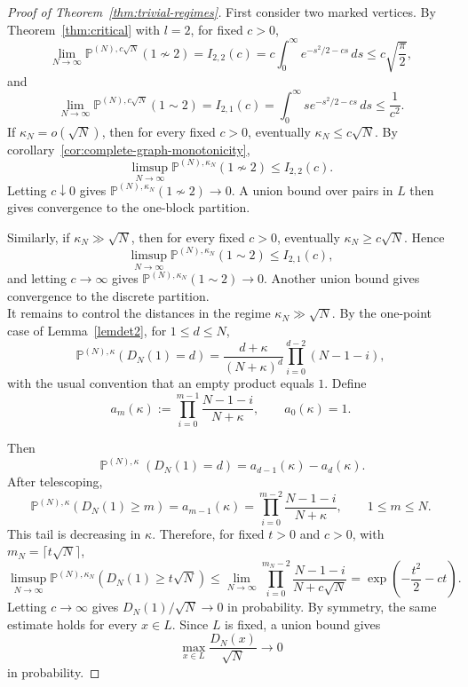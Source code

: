 \documentclass[11pt]{article}
\DeclareMathOperator{\PP}{\mathbb{P}}
\begin{document}
\begin{proof}[Proof of Theorem~\ref{thm:trivial-regimes}]
First consider two marked vertices. By Theorem~\ref{thm:critical} with
\(l=2\), for fixed \(c>0\),
\[
\lim_{N\to\infty}\mathbb P^{(N),c\sqrt N}(1\not\sim 2)
=I_{2,2}(c)
=c\int_0^\infty e^{-s^2/2-cs}\,ds
\le c\sqrt{\frac\pi2},
\]
and
\[
\lim_{N\to\infty}\mathbb P^{(N),c\sqrt N}(1\sim 2)
=I_{2,1}(c)
=\int_0^\infty s e^{-s^2/2-cs}\,ds
\le \frac1{c^2}.
\]
If \(\kappa_N=o(\sqrt N)\), then for every fixed \(c>0\), eventually
\(\kappa_N\le c\sqrt N\). By corollary~\ref{cor:complete-graph-monotonicity},
\[
\limsup_{N\to\infty}\mathbb P^{(N),\kappa_N}(1\not\sim 2)
\le I_{2,2}(c).
\]
Letting \(c\downarrow0\) gives
\(\mathbb P^{(N),\kappa_N}(1\not\sim 2)\to0\). A union bound over pairs in
\(L\) then gives convergence to the one-block partition.

Similarly, if \(\kappa_N\gg\sqrt N\), then for every fixed \(c>0\), eventually
\(\kappa_N\ge c\sqrt N\). Hence
\[
\limsup_{N\to\infty}\mathbb P^{(N),\kappa_N}(1\sim 2)
\le I_{2,1}(c),
\]
and letting \(c\to\infty\) gives
\(\mathbb P^{(N),\kappa_N}(1\sim 2)\to0\). Another union bound gives convergence to the discrete partition.\\

\medskip
\noindent
It remains to control the distances in the regime \(\kappa_N\gg\sqrt N\).
By the one-point case of Lemma~\ref{lemdet2}, for \(1\le d\le N\),
\[
\mathbb P^{(N),\kappa}(D_N(1)=d)
=
\frac{d+\kappa}{(N+\kappa)^d}
\prod_{i=0}^{d-2}(N-1-i),
\]
with the usual convention that an empty product equals \(1\).
Define
\[
a_m(\kappa):=\prod_{i=0}^{m-1}\frac{N-1-i}{N+\kappa},
\qquad a_0(\kappa)=1.
\]

Then
\[
\PP^{(N),\kappa}(D_N(1)=d)=a_{d-1}(\kappa)-a_d(\kappa).\]
After telescoping,
\[
\mathbb P^{(N),\kappa}(D_N(1)\ge m)
=
a_{m-1}(\kappa)=\prod_{i=0}^{m-2}\frac{N-1-i}{N+\kappa},
\qquad 1\le m\le N.
\]
This tail is decreasing in \(\kappa\). Therefore, for fixed \(t>0\) and
\(c>0\), with \(m_N=\lceil t\sqrt N\rceil\),
\[
\limsup_{N\to\infty}
\mathbb P^{(N),\kappa_N}\!\left(D_N(1)\ge t\sqrt N\right)
\le
\lim_{N\to\infty}
\prod_{i=0}^{m_N-2}\frac{N-1-i}{N+c\sqrt N}
=
\exp\!\left(-\frac{t^2}{2}-ct\right).
\]
Letting \(c\to\infty\) gives \(D_N(1)/\sqrt N\to0\) in probability. By symmetry, the same estimate holds for every \(x\in L\). Since \(L\) is
fixed, a union bound gives
\[
\max_{x\in L}\frac{D_N(x)}{\sqrt N}\longrightarrow0
\]
in probability.
\end{proof}
\end{document}
